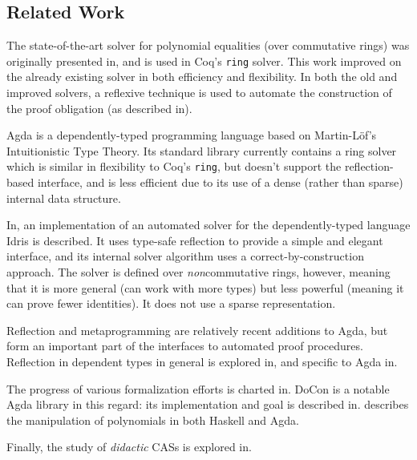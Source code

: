 \documentclass[draft, twocolumn]{article}
\theoremstyle{definition}
\theoremstyle{definition}
\begin{document}
\subsection{Related Work} 
The state-of-the-art solver for polynomial equalities (over commutative rings)
was originally presented in\cite{gregoire_proving_2005}, and is used in Coq's
\verb+ring+ solver. This work improved on the already existing
solver\cite{Coq:manual} in both efficiency and flexibility. In both the old and
improved solvers, a reflexive technique is used to automate the construction of
the proof obligation (as described in\cite{boutin_using_1997}).

Agda\cite{norell_dependently_2008} is a dependently-typed programming language
based on Martin-Löf's Intuitionistic Type
Theory\cite{martin-lof_intuitionistic_1980}. Its standard
library\cite{danielsson_agda_2018} currently contains a ring solver which is
similar in flexibility to Coq's \verb+ring+, but doesn't support the
reflection-based interface, and is less efficient due to its use of a dense
(rather than sparse) internal data structure.

In\cite{geuvers_automatically_2017}, an implementation of an automated solver
for the dependently-typed language Idris\cite{brady_idris_2013} is described. It
uses type-safe reflection to provide a simple and elegant interface, and its
internal solver algorithm uses a correct-by-construction approach. The solver is
defined over \emph{non}commutative rings, however, meaning that it is more
general (can work with more types) but less powerful (meaning it can prove fewer
identities). It does not use a sparse representation.

Reflection and metaprogramming are relatively recent additions to Agda, but form
an important part of the interfaces to automated proof procedures. Reflection in
dependent types in general is explored in\cite{christiansen_practical_2015}, and
specific to Agda in\cite{van_der_walt_reflection_2012}.

The progress of various formalization efforts is charted
in\cite{wiedijk_formalizing_2018}. DoCon\cite{meshveliani_docon-provable_2018}
is a notable Agda library in this regard: its implementation and goal is
described in\cite{meshveliani_dependent_2013}. \cite{cheng_functional_2018}
describes the manipulation of polynomials in both Haskell and Agda.

Finally, the study of \emph{didactic} CASs is explored
in\cite{lioubartsev_constructing_2016}.
\end{document}
